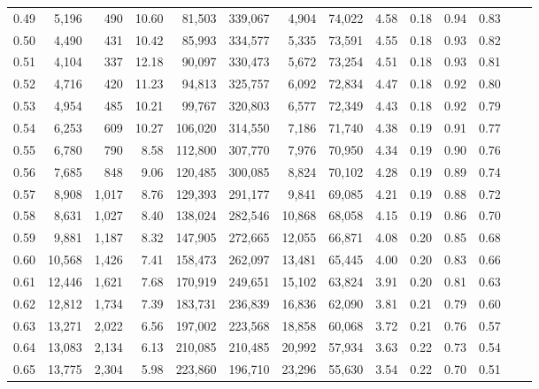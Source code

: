 \begin{tabular}{rrrrrrrrrrrrrr}
0.49 &   5,196 &    490 &   10.60 &   81,503 &  339,067 &   4,904 &  74,022 &  4.58 &  0.18 &  0.94 &      0.83 \\
0.50 &   4,490 &    431 &   10.42 &   85,993 &  334,577 &   5,335 &  73,591 &  4.55 &  0.18 &  0.93 &      0.82 \\
0.51 &   4,104 &    337 &   12.18 &   90,097 &  330,473 &   5,672 &  73,254 &  4.51 &  0.18 &  0.93 &      0.81 \\
0.52 &   4,716 &    420 &   11.23 &   94,813 &  325,757 &   6,092 &  72,834 &  4.47 &  0.18 &  0.92 &      0.80 \\
0.53 &   4,954 &    485 &   10.21 &   99,767 &  320,803 &   6,577 &  72,349 &  4.43 &  0.18 &  0.92 &      0.79 \\
0.54 &   6,253 &    609 &   10.27 &  106,020 &  314,550 &   7,186 &  71,740 &  4.38 &  0.19 &  0.91 &      0.77 \\
0.55 &   6,780 &    790 &    8.58 &  112,800 &  307,770 &   7,976 &  70,950 &  4.34 &  0.19 &  0.90 &      0.76 \\
0.56 &   7,685 &    848 &    9.06 &  120,485 &  300,085 &   8,824 &  70,102 &  4.28 &  0.19 &  0.89 &      0.74 \\
0.57 &   8,908 &  1,017 &    8.76 &  129,393 &  291,177 &   9,841 &  69,085 &  4.21 &  0.19 &  0.88 &      0.72 \\
0.58 &   8,631 &  1,027 &    8.40 &  138,024 &  282,546 &  10,868 &  68,058 &  4.15 &  0.19 &  0.86 &      0.70 \\
0.59 &   9,881 &  1,187 &    8.32 &  147,905 &  272,665 &  12,055 &  66,871 &  4.08 &  0.20 &  0.85 &      0.68 \\
0.60 &  10,568 &  1,426 &    7.41 &  158,473 &  262,097 &  13,481 &  65,445 &  4.00 &  0.20 &  0.83 &      0.66 \\
0.61 &  12,446 &  1,621 &    7.68 &  170,919 &  249,651 &  15,102 &  63,824 &  3.91 &  0.20 &  0.81 &      0.63 \\
0.62 &  12,812 &  1,734 &    7.39 &  183,731 &  236,839 &  16,836 &  62,090 &  3.81 &  0.21 &  0.79 &      0.60 \\
0.63 &  13,271 &  2,022 &    6.56 &  197,002 &  223,568 &  18,858 &  60,068 &  3.72 &  0.21 &  0.76 &      0.57 \\
0.64 &  13,083 &  2,134 &    6.13 &  210,085 &  210,485 &  20,992 &  57,934 &  3.63 &  0.22 &  0.73 &      0.54 \\
0.65 &  13,775 &  2,304 &    5.98 &  223,860 &  196,710 &  23,296 &  55,630 &  3.54 &  0.22 &  0.70 &      0.51 \\

\end{tabular}
